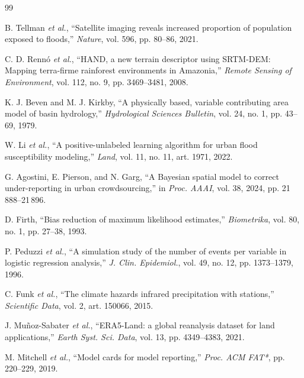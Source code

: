 \documentclass[conference]{IEEEtran}
\begin{document}
\fontsize{6.8}{7.4}\selectfont
\begin{thebibliography}{99}
\setlength{\itemsep}{0.4pt}
\setlength{\parskip}{0pt}


B. Tellman \emph{et al.}, ``Satellite imaging reveals increased proportion of
population exposed to floods,'' \emph{Nature}, vol. 596, pp. 80--86, 2021.

C. D. Rennó \emph{et al.}, ``HAND, a new terrain descriptor using SRTM-DEM:
Mapping terra-firme rainforest environments in Amazonia,''
\emph{Remote Sensing of Environment}, vol. 112, no. 9, pp. 3469--3481, 2008.


K. J. Beven and M. J. Kirkby, ``A physically based, variable contributing area
model of basin hydrology,'' \emph{Hydrological Sciences Bulletin}, vol. 24,
no. 1, pp. 43--69, 1979.


W. Li \emph{et al.}, ``A positive-unlabeled learning algorithm for urban flood
susceptibility modeling,'' \emph{Land},
vol. 11, no. 11, art. 1971, 2022.


G. Agostini, E. Pierson, and N. Garg, ``A Bayesian spatial model to correct
under-reporting in urban crowdsourcing,'' in \emph{Proc. AAAI}, vol. 38, 2024,
pp. 21\,888--21\,896.

D. Firth, ``Bias reduction of maximum likelihood estimates,''
\emph{Biometrika}, vol. 80, no. 1, pp. 27--38, 1993.


P. Peduzzi \emph{et al.}, ``A simulation study of the number of events per
variable in logistic regression analysis,'' \emph{J. Clin. Epidemiol.}, vol. 49,
no. 12, pp. 1373--1379, 1996.


C. Funk \emph{et al.}, ``The climate hazards infrared precipitation with
stations,'' \emph{Scientific Data}, vol. 2, art. 150066, 2015.

J. Muñoz-Sabater \emph{et al.}, ``ERA5-Land: a global reanalysis dataset for land
applications,'' \emph{Earth Syst. Sci. Data}, vol. 13, pp. 4349--4383, 2021.

M. Mitchell \emph{et al.}, ``Model cards for model reporting,'' \emph{Proc. ACM
FAT*}, pp. 220--229, 2019.

\end{thebibliography}
\end{document}
